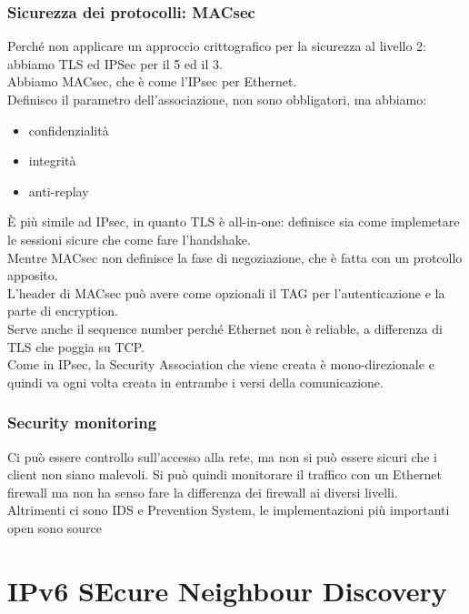 \documentclass[12pt, oneside]{extbook} %
\begin{document}
\subsubsection{Sicurezza dei protocolli: MACsec}
Perché non applicare un approccio crittografico per la sicurezza al livello 2: abbiamo TLS ed IPSec per il 5 ed il 3.
\\Abbiamo MACsec, che è come l'IPsec per Ethernet.
\\Definisco il parametro dell'associazione, non sono obbligatori, ma abbiamo:
    \begin{itemize}
        \item confidenzialità
        \item integrità
        \item anti-replay
    \end{itemize}
È più simile ad IPsec, in quanto TLS è all-in-one: definisce sia come implemetare le sessioni sicure che come fare l'handshake.
\\Mentre MACsec non definisce la fase di negoziazione, che è fatta con un protcollo apposito.
\\L'header di MACsec può avere come opzionali il TAG per l'autenticazione e la parte di encryption.
\\Serve anche il sequence number perché Ethernet non è reliable, a differenza di TLS che poggia su TCP.
\\Come in IPsec, la Security Association che viene creata è mono-direzionale e quindi va ogni volta creata in entrambe i versi della comunicazione.
\subsubsection{Security monitoring}
Ci può essere controllo sull'accesso alla rete, ma non si può essere sicuri che i client non siano malevoli. Si può quindi monitorare il traffico con un Ethernet firewall ma non ha senso fare la differenza dei firewall ai diversi livelli.
\\Altrimenti ci sono IDS e Prevention System, le implementazioni più importanti open sono source

\section{IPv6 SEcure Neighbour Discovery}
\end{document}
